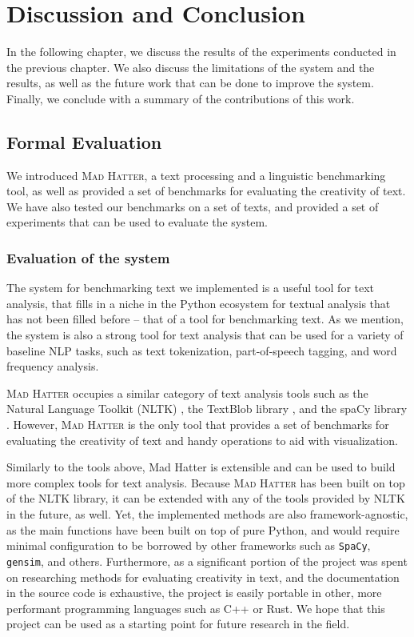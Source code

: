 \chapter{Discussion and Conclusion}
\label{chap:discussion}

In the following chapter, we discuss the results of the experiments conducted in the previous chapter. We also discuss the limitations of the system and the results, as well as the future work that can be done to improve the system. Finally, we conclude with a summary of the contributions of this work. 

\section{Formal Evaluation}
We introduced \textsc{Mad Hatter}, a text processing and a linguistic benchmarking tool, as well as provided a set of benchmarks for evaluating the creativity of text. We have also tested our benchmarks on a set of texts, and provided a set of experiments that can be used to evaluate the system. 

\subsection{Evaluation of the system}
The system for benchmarking text we implemented is a useful tool for text analysis, that fills in a niche in the Python ecosystem for textual analysis that has not been filled before -- that of a tool for benchmarking text. As we mention, the system is also a strong tool for text analysis that can be used for a variety of baseline NLP tasks, such as text tokenization, part-of-speech tagging, and word frequency analysis.

\textsc{Mad Hatter} occupies a similar category of text analysis tools such as the Natural Language Toolkit (NLTK) \citep{nltk_citation}, the TextBlob library \citep{textblob}, and the spaCy library \citep{spacy2}. However, \textsc{Mad Hatter} is the only tool that provides a set of benchmarks for evaluating the creativity of text and handy operations to aid with visualization. 

Similarly to the tools above, Mad Hatter is extensible and can be used to build more complex tools for text analysis. Because \textsc{Mad Hatter} has been built on top of the NLTK library, it can be extended with any of the tools provided by NLTK in the future, as well. Yet, the implemented methods are also framework-agnostic, as the main functions have been built on top of pure Python, and would require minimal configuration to be borrowed by other frameworks such as \texttt{SpaCy}, \texttt{gensim}, and others. Furthermore, as a significant portion of the project was spent on researching methods for evaluating creativity in text, and the documentation in the source code is exhaustive, the project is easily portable in other, more performant programming languages such as C++ or Rust. We hope that this project can be used as a starting point for future research in the field.


